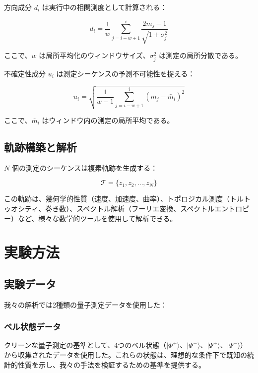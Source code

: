 \documentclass[a4paper,11pt]{article}
\begin{document}
\begin{CJK}{UTF8}{min}
方向成分 $d_i$ は実行中の相関測度として計算される：

\begin{equation}
d_i = \frac{1}{w} \sum_{j=i-w+1}^{i} \frac{2m_j - 1}{\sqrt{1 + \sigma^2_j}}
\label{eq:direction}
\end{equation}

ここで、$w$ は局所平均化のウィンドウサイズ、$\sigma^2_j$ は測定の局所分散である。

不確定性成分 $u_i$ は測定シーケンスの予測不可能性を捉える：

\begin{equation}
u_i = \sqrt{\frac{1}{w-1} \sum_{j=i-w+1}^{i} (m_j - \bar{m}_i)^2}
\label{eq:uncertainty}
\end{equation}

ここで、$\bar{m}_i$ はウィンドウ内の測定の局所平均である。

\subsection{軌跡構築と解析}

$N$ 個の測定のシーケンスは複素軌跡を生成する：

\begin{equation}
\mathcal{T} = \{z_1, z_2, \ldots, z_N\}
\label{eq:trajectory}
\end{equation}

この軌跡は、幾何学的性質（速度、加速度、曲率）、トポロジカル測度（トルトゥオシティ、巻き数）、スペクトル解析（フーリエ変換、スペクトルエントロピー）など、様々な数学的ツールを使用して解析できる。

\section{実験方法}

\subsection{実験データ}

我々の解析では2種類の量子測定データを使用した：

\subsubsection{ベル状態データ}
クリーンな量子測定の基準として、4つのベル状態（$|\Phi^+\rangle$、$|\Phi^-\rangle$、$|\Psi^+\rangle$、$|\Psi^-\rangle$）から収集されたデータを使用した。これらの状態は、理想的な条件下で既知の統計的性質を示し、我々の手法を検証するための基準を提供する。


\end{CJK}
\end{document}
